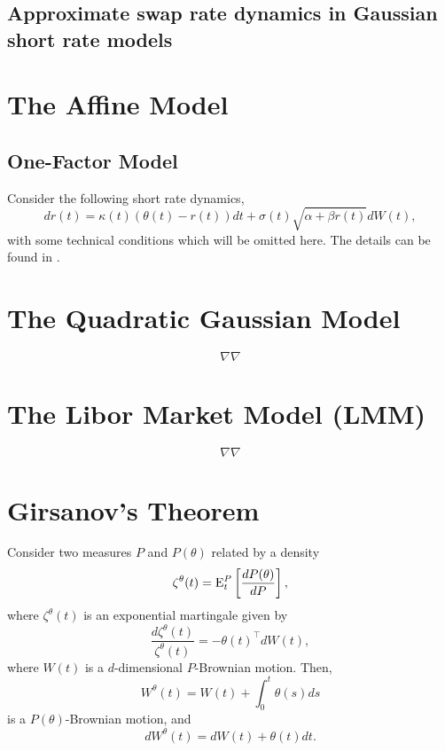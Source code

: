 \documentclass[12pt]{article}
\begin{document}
  \subsection{Approximate swap rate dynamics in Gaussian short rate models}



\section{The Affine Model}

  \subsection{One-Factor Model}

    Consider the following short rate dynamics,
    \begin{equation}
      dr(t)=\kappa(t)\left(\theta(t)-r(t)\right)dt + \sigma(t)\sqrt{\alpha + \beta r(t)}dW(t),
    \end{equation}
    with some technical conditions which will be omitted here. The details can be found in \cite{AP}.

\section{The Quadratic Gaussian Model}

  $$\nabla\nabla$$

    

\section{The Libor Market Model (LMM)}

  $$\nabla\nabla$$

\appendix

  \section{Girsanov's Theorem}
  \label{Girsanov}

  Consider two measures $P$ and $P(\theta)$ related by a density
  \begin{equation}
    \zeta^{\theta}(t) = {\rm E}_t^P\left[\frac{dP(\theta)}{dP}\right],
  \end{equation}
  where $\zeta^{\theta}(t)$ is an exponential martingale given by
  \begin{equation}
    \frac{d\zeta^{\theta}(t)}{\zeta^{\theta}(t)}=-\theta(t)^{\top}dW(t),
  \end{equation}
  where $W(t)$ is a $d$-dimensional $P$-Brownian motion. Then,
  \begin{equation}
    W^{\theta}(t) = W(t)+\int_0^t\theta(s)ds
  \end{equation}
  is a $P(\theta)$-Brownian motion, and
  \begin{equation}
    dW^{\theta}(t) = dW(t)+ \theta(t)dt.
  \end{equation}
\end{document}
